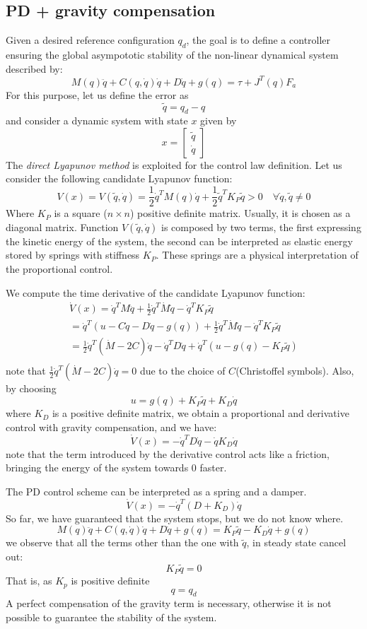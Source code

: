 \documentclass{book}
\begin{document}
\subsection{PD + gravity compensation}
Given a desired reference configuration $q_d$, the goal is to define a controller ensuring the global asympototic stability of the non-linear dynamical system described by:
\[
    M(q)\ddot{q}+C(q,\dot{q})\dot{q}+D\dot{q}+g(q) = \tau + J^T(q)F_a
\]
For this purpose, let us define the error as
\[
    \tilde{q}=q_d-q
\]
and consider a dynamic system with state $x$ given by
\[
    x=\begin{bmatrix}
        \tilde{q}\\\dot{q}
    \end{bmatrix}
\]
The \emph{direct Lyapunov method} is exploited for the control law definition.
Let us consider the following candidate Lyapunov function:
\[
    V(x) = V(\tilde{q},\dot{q}) = \frac{1}{2}\dot{q}^TM(q)\dot{q}+\frac{1}{2}\tilde{q}^TK_P\tilde{q}>0 \quad \forall \dot{q},\tilde{q} \neq 0
\]
Where $K_P$ is a square ($n\times n$) positive definite matrix. Usually, it is chosen as a diagonal matrix. Function $V(\tilde{q},\dot{q})$ is composed by two terms, the first expressing the kinetic energy of the system, the second can be interpreted as elastic energy stored by springs with stiffness $K_P$. These springs are a physical interpretation of the proportional control.

We compute the time derivative of the candidate Lyapunov function:
\begin{gather*}
    \dot{V}(x)=\dot{q}^TM\ddot{q}+\frac{1}{2}\dot{q}^T\dot{M}\dot{q}-\dot{q}^TK_P\tilde{q}\\
    =\dot{q}^T(u-C\dot{q}-D\dot{q}-g(q))+\frac{1}{2}\dot{q}^T\dot{M}\dot{q}-\dot{q}^TK_P\tilde{q}\\
    =\frac{1}{2}\dot{q}^T(\dot{M}-2C)\dot{q}-\dot{q}^TD\dot{q}+\dot{q}^T(u-g(q)-K_P\tilde{q})\\
\end{gather*}
note that $\frac{1}{2}\dot{q}^T(\dot{M}-2C)\dot{q}=0$ due to the choice of $C$(Christoffel symbols). Also, by choosing
\[
    u=g(q)+K_P\tilde{q}+K_D\dot{q}
\]
where $K_D$ is a positive definite matrix, we obtain a proportional and derivative control with gravity compensation, and we have:
\[
    \dot{V}(x)=-\dot{q}^TD\dot{q}-\dot{q}K_D\dot{q}
\]
note that the term introduced by the derivative control acts like a friction, bringing the energy of the system towards 0 faster.

The PD control scheme can be interpreted as a spring and a damper.
\[
    \dot{V}(x)=-\dot{q}^T(D+K_D)\dot{q}
\]
So far, we have guaranteed that the system stops, but we do not know where.
\[
    M(q)\ddot{q}+C(q,\dot{q})\dot{q}+D\dot{q}+g(q) = K_P\tilde{q}-K_D\dot{q}+g(q) 
\]
we observe that all the terms other than the one with $\tilde{q}$, in steady state cancel out:
\[
    K_P\tilde{q} = 0
\]
That is, as $K_p$ is positive definite
\[
    q=q_d
\]
A perfect compensation of the gravity term is necessary, otherwise it is not possible to guarantee the stability of the system.
\end{document}
